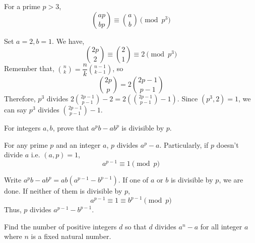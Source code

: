 \documentclass{subfile}
\begin{document}
		\begin{solution}
			\begin{theorem}
				For a prime $p>3$, \[\binom{ap}{bp}\equiv\binom{a}{b}\pmod {p^3}\]
			\end{theorem}
			Set $a=2,b=1$. We have, \[\binom{2p}{2}\equiv\binom{2}{1}\equiv2\pmod {p^3}\]
			Remember that, $\binom{n}{k}=\dfrac{n}{k}\binom{n-1}{k-1}$, so \[\binom{2p}{p}=2\binom{2p-1}{p-1}\]
			Therefore, $p^3$ divides $2\binom{2p-1}{p-1}-2=2\left(\binom{2p-1}{p-1}-1\right)$. Since $(p^3,2)=1$, we can say $p^3$ divides $\binom{2p-1}{p-1}-1$.
		\end{solution}
		
		\begin{problem}\label{e2}
			For integers $a,b$, prove that $a^pb-ab^p$ is divisible by $p$.
		\end{problem}
		
		\begin{solution}
			\begin{theorem}
				For any prime $p$ and an integer $a$, $p$ divides $a^p-a$. Particularly, if $p$ doesn't divide $a$ i.e. $(a,p)=1$, 
				\[a^{p-1}\equiv1\pmod p\]
			\end{theorem}
			Write $a^pb-ab^p=ab(a^{p-1}-b^{p-1})$. If one of $a$ or $b$ is divisible by $p$, we are done. If neither of them is divisible by $p$,
			\[a^{p-1}\equiv1\equiv b^{p-1}\pmod p\]
			Thus, $p$ divides $a^{p-1}-b^{p-1}$.
		\end{solution}
		
		\begin{problem}
			Find the number of positive integers $d$ so that $d$ divides $a^n-a$ for all integer $a$ where $n$ is a fixed natural number.
		\end{problem}
		
\end{document}
